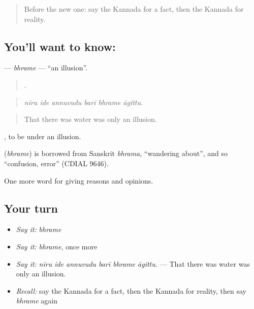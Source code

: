 \label{lesson:KA-C382-bhrame}



\begin{quote}
Before the new one: say the Kannada for a fact, then the Kannada for reality.
\end{quote}

\subsection*{You'll want to know: }
\textbf{} — \emph{bhrame} — \textquotedblleft{}an illusion\textquotedblright{}.

\begin{quote}
     .
\end{quote}

\begin{quote}
\emph{nīru ide annuvudu barī bhrame āgittu.}
\end{quote}

\begin{quote}
That there was water was only an illusion.
\end{quote}

 , to be under an illusion.

\begin{cousinweb}
\textbf{} (\emph{bhrame}) is borrowed from Sanskrit \emph{bhrama}, \textquotedblleft{}wandering about\textquotedblright{}, and so \textquotedblleft{}confusion, error\textquotedblright{} (CDIAL 9646).
\end{cousinweb}

\begin{grammarlens}[title={What you've built}]
One more word for giving reasons and opinions.
\end{grammarlens}

\subsection*{Your turn}
\begin{itemize}
\raggedright
  \item \emph{Say it:} \emph{bhrame}
  \item \emph{Say it:} \emph{bhrame}, once more
  \item \emph{Say it:} \emph{nīru ide annuvudu barī bhrame āgittu.} — That there was water was only an illusion.
  \item \emph{Recall:} say the Kannada for a fact, then the Kannada for reality, then say \emph{bhrame} again
\end{itemize}

